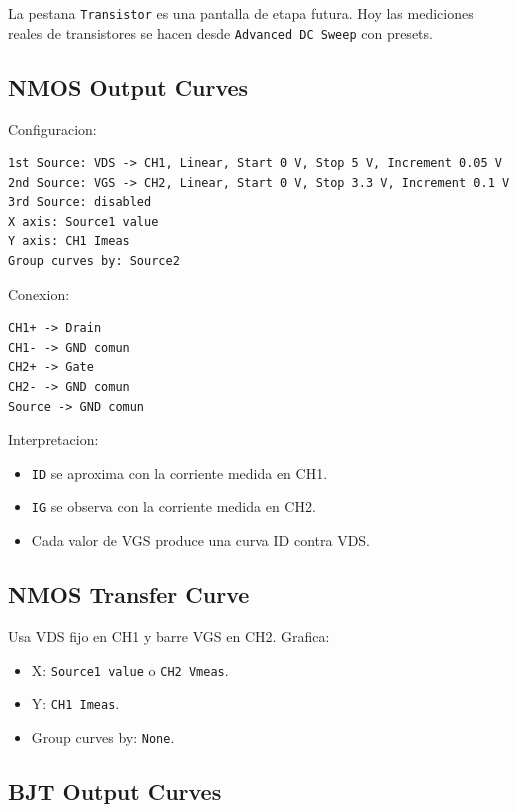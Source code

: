 \documentclass[11pt,letterpaper]{article}
\begin{document}
La pestana \texttt{Transistor} es una pantalla de etapa futura. Hoy las
mediciones reales de transistores se hacen desde \texttt{Advanced DC Sweep} con
presets.

\subsection{NMOS Output Curves}

Configuracion:

\begin{verbatim}
1st Source: VDS -> CH1, Linear, Start 0 V, Stop 5 V, Increment 0.05 V
2nd Source: VGS -> CH2, Linear, Start 0 V, Stop 3.3 V, Increment 0.1 V
3rd Source: disabled
X axis: Source1 value
Y axis: CH1 Imeas
Group curves by: Source2
\end{verbatim}

Conexion:

\begin{verbatim}
CH1+ -> Drain
CH1- -> GND comun
CH2+ -> Gate
CH2- -> GND comun
Source -> GND comun
\end{verbatim}

Interpretacion:

\begin{itemize}
  \item \texttt{ID} se aproxima con la corriente medida en CH1.
  \item \texttt{IG} se observa con la corriente medida en CH2.
  \item Cada valor de VGS produce una curva ID contra VDS.
\end{itemize}

\subsection{NMOS Transfer Curve}

Usa VDS fijo en CH1 y barre VGS en CH2. Grafica:

\begin{itemize}
  \item X: \texttt{Source1 value} o \texttt{CH2 Vmeas}.
  \item Y: \texttt{CH1 Imeas}.
  \item Group curves by: \texttt{None}.
\end{itemize}

\subsection{BJT Output Curves}
\end{document}

